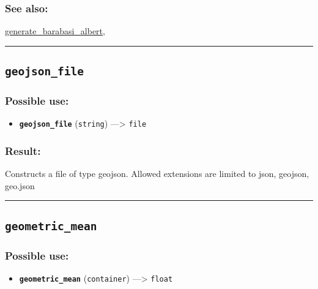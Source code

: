 \documentclass[]{book}
\providecommand{\tightlist}{%
  \setlength{\itemsep}{0pt}\setlength{\parskip}{0pt}}
\theoremstyle{definition}
\theoremstyle{definition}
\theoremstyle{definition}
\theoremstyle{remark}
\begin{document}
\subsubsection{See also:}\label{see-also-105}

\href{OperatorsDH\#generate_barabasi_albert}{generate\_barabasi\_albert},

\begin{center}\rule{0.5\linewidth}{\linethickness}\end{center}

\subsection{\texorpdfstring{\texttt{geojson\_file}}{geojson\_file}}\label{geojson_file}

\subsubsection{Possible use:}\label{possible-use-189}

\begin{itemize}
\tightlist
\item
  \textbf{\texttt{geojson\_file}} (\texttt{string}) ---\textgreater{}
  \texttt{file}
\end{itemize}

\subsubsection{Result:}\label{result-183}

Constructs a file of type geojson. Allowed extensions are limited to
json, geojson, geo.json

\begin{center}\rule{0.5\linewidth}{\linethickness}\end{center}

\subsection{\texorpdfstring{\texttt{geometric\_mean}}{geometric\_mean}}\label{geometric_mean}

\subsubsection{Possible use:}\label{possible-use-190}

\begin{itemize}
\tightlist
\item
  \textbf{\texttt{geometric\_mean}} (\texttt{container})
  ---\textgreater{} \texttt{float}
\end{itemize}
\end{document}
